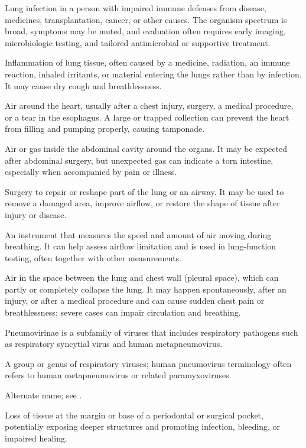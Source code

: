  Lung infection in a person with impaired immune defenses from disease, medicines, transplantation, cancer, or other causes. The organism spectrum is broad, symptoms may be muted, and evaluation often requires early imaging, microbiologic testing, and tailored antimicrobial or supportive treatment.

 Inflammation of lung tissue, often caused by a medicine, radiation, an immune reaction, inhaled irritants, or material entering the lungs rather than by infection. It may cause dry cough and breathlessness.

 Air around the heart, usually after a chest injury, surgery, a medical procedure, or a tear in the esophagus. A large or trapped collection can prevent the heart from filling and pumping properly, causing tamponade.

 Air or gas inside the abdominal cavity around the organs. It may be expected after abdominal surgery, but unexpected gas can indicate a torn intestine, especially when accompanied by pain or illness.

 Surgery to repair or reshape part of the lung or an airway. It may be used to remove a damaged area, improve airflow, or restore the shape of tissue after injury or disease.

 An instrument that measures the speed and amount of air moving during breathing. It can help assess airflow limitation and is used in lung-function testing, often together with other measurements.

 Air in the space between the lung and chest wall (pleural space), which can partly or completely collapse the lung. It may happen spontaneously, after an injury, or after a medical procedure and can cause sudden chest pain or breathlessness; severe cases can impair circulation and breathing.

 Pneumovirinae is a subfamily of viruses that includes respiratory pathogens such as respiratory syncytial virus and human metapneumovirus.

 A group or genus of respiratory viruses; human pneumovirus terminology often refers to human metapneumovirus or related paramyxoviruses.

 Alternate name; see .

 Loss of tissue at the margin or base of a periodontal or surgical pocket, potentially exposing deeper structures and promoting infection, bleeding, or impaired healing.

